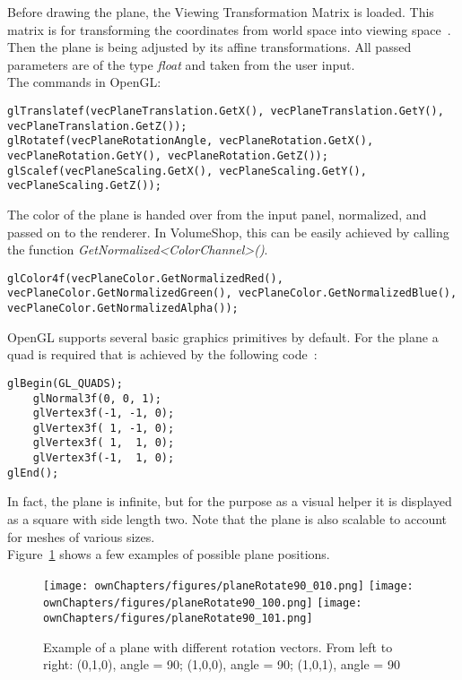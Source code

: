 Before drawing the plane, the Viewing Transformation Matrix is loaded. This matrix is for transforming the coordinates from world space into viewing space~\cite{book:computerGraphicsHearn}.\\
Then the plane is being adjusted by its affine transformations. All passed parameters are of the type \emph{float} and taken from the user input.\\
The commands in OpenGL:
\begin{lstlisting}
glTranslatef(vecPlaneTranslation.GetX(), vecPlaneTranslation.GetY(), vecPlaneTranslation.GetZ());
glRotatef(vecPlaneRotationAngle, vecPlaneRotation.GetX(), vecPlaneRotation.GetY(), vecPlaneRotation.GetZ());
glScalef(vecPlaneScaling.GetX(), vecPlaneScaling.GetY(), vecPlaneScaling.GetZ());
\end{lstlisting}

The color of the plane is handed over from the input panel, normalized, and passed on to the renderer. In VolumeShop, this can be easily achieved by calling the function \emph{GetNormalized<ColorChannel>()}.
\begin{lstlisting}
glColor4f(vecPlaneColor.GetNormalizedRed(), vecPlaneColor.GetNormalizedGreen(), vecPlaneColor.GetNormalizedBlue(), vecPlaneColor.GetNormalizedAlpha());
\end{lstlisting}

OpenGL supports several basic graphics primitives by default. For the plane a quad is required that is achieved by the following code~\cite{book:computerGraphicsHill}: %
\begin{lstlisting}
glBegin(GL_QUADS);
	glNormal3f(0, 0, 1);
	glVertex3f(-1, -1, 0);
	glVertex3f( 1, -1, 0);
	glVertex3f( 1,  1, 0);
	glVertex3f(-1,  1, 0);
glEnd();
\end{lstlisting}

In fact, the plane is infinite, but for the purpose as a visual helper it is displayed as a square with side length two. Note that the plane is also scalable to account for meshes of various sizes.\\

Figure~\ref{fig:plane} shows a few examples of possible plane positions.
\begin{figure}%
\centering
\texttt{[image: ownChapters/figures/planeRotate90\_010.png]}%
\hspace{5.00mm}
\texttt{[image: ownChapters/figures/planeRotate90\_100.png]}%
\hspace{5.00mm}
\texttt{[image: ownChapters/figures/planeRotate90\_101.png]}%
\caption{Example of a plane with different rotation vectors. From left to right: (0,1,0), angle = 90; (1,0,0), angle = 90; (1,0,1), angle = 90}%
\label{fig:plane}%
\end{figure}

